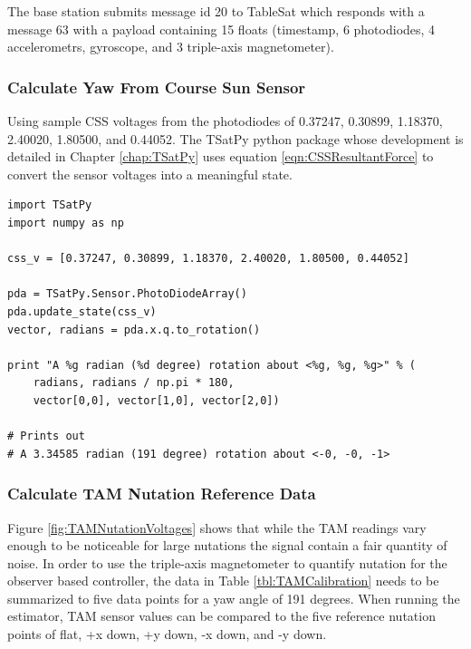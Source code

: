 The base station submits message id 20 to TableSat which responds with a message 63 with a payload containing 15 floats (timestamp, 6 photodiodes, 4 accelerometrs, gyroscope, and 3 triple-axis magnetometer).

\subsubsection{Calculate Yaw From Course Sun Sensor}

Using sample CSS voltages from the photodiodes of 0.37247, 0.30899, 1.18370, 2.40020, 1.80500, and 0.44052.  The TSatPy python package whose development is detailed in Chapter \ref{chap:TSatPy} uses equation \ref{eqn:CSSResultantForce} to convert the sensor voltages into a meaningful state.

\begin{singlespace}
  \begin{verbatim}
import TSatPy
import numpy as np

css_v = [0.37247, 0.30899, 1.18370, 2.40020, 1.80500, 0.44052]

pda = TSatPy.Sensor.PhotoDiodeArray()
pda.update_state(css_v)
vector, radians = pda.x.q.to_rotation()

print "A %g radian (%d degree) rotation about <%g, %g, %g>" % (
    radians, radians / np.pi * 180,
    vector[0,0], vector[1,0], vector[2,0])

# Prints out
# A 3.34585 radian (191 degree) rotation about <-0, -0, -1>
  \end{verbatim}
  \nocite{minted}
\end{singlespace}

\subsubsection{Calculate TAM Nutation Reference Data}

Figure \ref{fig:TAMNutationVoltages} shows that while the TAM readings vary enough to be noticeable for large nutations the signal contain a fair quantity of noise.  In order to use the triple-axis magnetometer to quantify nutation for the observer based controller, the data in Table \ref{tbl:TAMCalibration} needs to be summarized to five data points for a yaw angle of 191 degrees.  When running the estimator, TAM sensor values can be compared to the five reference nutation points of flat, +x down, +y down, -x down, and -y down.

